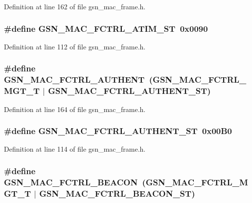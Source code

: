 Definition at line 162 of file gsn\_\-mac\_\-frame.h.

\hypertarget{a00523_a9b63f2806a249f4c43e8d32cfe6ee11e}{
\subsubsection[{GSN\_\-MAC\_\-FCTRL\_\-ATIM\_\-ST}]{\setlength{\rightskip}{0pt plus 5cm}\#define GSN\_\-MAC\_\-FCTRL\_\-ATIM\_\-ST~0x0090}}
\label{a00523_a9b63f2806a249f4c43e8d32cfe6ee11e}


Definition at line 112 of file gsn\_\-mac\_\-frame.h.

\hypertarget{a00523_a84f057e939079aea7b655edfdbde4850}{
\subsubsection[{GSN\_\-MAC\_\-FCTRL\_\-AUTHENT}]{\setlength{\rightskip}{0pt plus 5cm}\#define GSN\_\-MAC\_\-FCTRL\_\-AUTHENT~(GSN\_\-MAC\_\-FCTRL\_\-MGT\_\-T     $|$ GSN\_\-MAC\_\-FCTRL\_\-AUTHENT\_\-ST)}}
\label{a00523_a84f057e939079aea7b655edfdbde4850}


Definition at line 164 of file gsn\_\-mac\_\-frame.h.

\hypertarget{a00523_af71c2c5c82e67c9f5eb1ff72d732c11c}{
\subsubsection[{GSN\_\-MAC\_\-FCTRL\_\-AUTHENT\_\-ST}]{\setlength{\rightskip}{0pt plus 5cm}\#define GSN\_\-MAC\_\-FCTRL\_\-AUTHENT\_\-ST~0x00B0}}
\label{a00523_af71c2c5c82e67c9f5eb1ff72d732c11c}


Definition at line 114 of file gsn\_\-mac\_\-frame.h.

\hypertarget{a00523_a0b434b38c7f3e6394611fb3bcbb2ac14}{
\subsubsection[{GSN\_\-MAC\_\-FCTRL\_\-BEACON}]{\setlength{\rightskip}{0pt plus 5cm}\#define GSN\_\-MAC\_\-FCTRL\_\-BEACON~(GSN\_\-MAC\_\-FCTRL\_\-MGT\_\-T     $|$ GSN\_\-MAC\_\-FCTRL\_\-BEACON\_\-ST)}}
\label{a00523_a0b434b38c7f3e6394611fb3bcbb2ac14}


